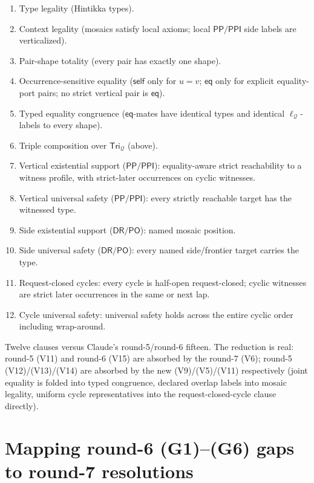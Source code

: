 \documentclass[11pt]{article}
\theoremstyle{definition}
\theoremstyle{remark}
\newcommand{\DR}{\mathsf{DR}}
\newcommand{\PO}{\mathsf{PO}}
\newcommand{\PP}{\mathsf{PP}}
\newcommand{\PPI}{\mathsf{PPI}}
\newcommand{\Q}{\mathcal Q}
\newcommand{\Tri}{\mathsf{Tri}}
\newcommand{\self}{\mathsf{self}}
\newcommand{\eqtag}{\mathsf{eq}}
\begin{document}
\begin{enumerate}[label=(V\arabic*)]
\item Type legality (Hintikka types).
\item Context legality (mosaics satisfy local axioms; local
$\PP/\PPI$ side labels are verticalized).
\item Pair-shape totality (every pair has exactly one shape).
\item Occurrence-sensitive equality ($\self$ only for $u=v$;
$\eqtag$ only for explicit equality-port pairs; no strict vertical
pair is $\eqtag$).
\item Typed equality congruence ($\eqtag$-mates have identical types
and identical $\ell_\Q$-labels to every shape).
\item Triple composition over $\Tri_\Q$ (above).
\item Vertical existential support ($\PP/\PPI$): equality-aware
strict reachability to a witness profile, with strict-later occurrences
on cyclic witnesses.
\item Vertical universal safety ($\PP/\PPI$): every strictly
reachable target has the witnessed type.
\item Side existential support ($\DR/\PO$): named mosaic position.
\item Side universal safety ($\DR/\PO$): every named side/frontier
target carries the type.
\item Request-closed cycles: every cycle is half-open
request-closed; cyclic witnesses are strict later occurrences in the
same or next lap.
\item Cycle universal safety: universal safety holds across the
entire cyclic order including wrap-around.
\end{enumerate}

Twelve clauses versus Claude's round-5/round-6 fifteen.  The
reduction is real: round-5 (V11) and round-6 (V15) are absorbed by
the round-7 (V6); round-5 (V12)/(V13)/(V14) are absorbed by the new
(V9)/(V5)/(V11) respectively (joint equality is folded into typed
congruence, declared overlap labels into mosaic legality, uniform
cycle representatives into the request-closed-cycle clause directly).

\section{Mapping round-6 (G1)--(G6) gaps to round-7 resolutions}
\label{sec:round6-gaps}
\end{document}
